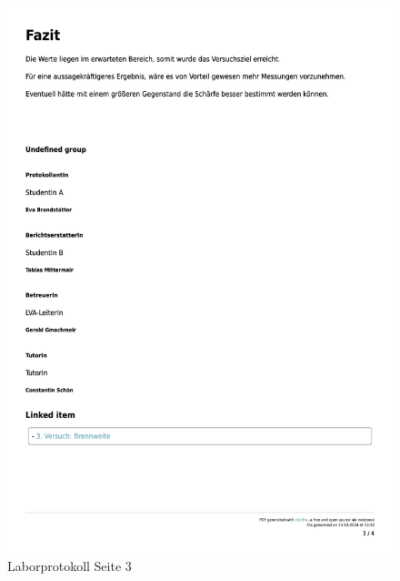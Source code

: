 \documentclass[a4paper,12pt]{article}
\begin{document}
\begin{figure}[H]
    \centering
    \includegraphics[width=1\textwidth]{bilder/Protokoll_Bilder/Protokoll3.png}
    \caption{Laborprotokoll Seite 3}
    \label{fig:Protokoll3}
\end{figure}

\newpage
\end{document}
